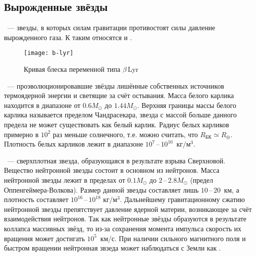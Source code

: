 \subsection{Вырожденные звёзды}
~--- звезды, в которых силам гравитации противостоят силы давление вырожденного газа. К таким относятся  и . 

\begin{figure}[!h]
	\centering
	\begin{minipage}[c]{0.49\tw}
 	\end{minipage}
 	\hfill
 	\begin{minipage}[c]{0.49\tw}
 		\centering
 		\texttt{[image: b-lyr]}	
 	\end{minipage}
 	\caption{Кривая блеска переменной типа $\beta$\,Lyr}
 	\label{pic:b-lyr}
 	\vspace{-.8pc}
\end{figure}
~--- проэволюционировавшие звёзды лишённые собственных источников термоядерной энергии и светящие за счёт остывания. Масса белого карлика находится в диапазоне от $0.6M_{\odot}$ до $1.44 M_{\odot}$. Верхняя границы массы белого карлика называется пределом Чандрасекара, звезда с массой больше данного предела не может существовать как белый карлик. Радиус белых карликов примерно в $10^2$ раз меньше солнечного, т.е. можно считать, что $R_\text{БК} \simeq R_\oplus$. Плотность белых карликов лежит в диапазоне $10^7$\,--\,$10^{10}$~$\text{кг}/\text{м}^3$.

~--- сверхплотная звезда, образующаяся в результате взрыва Сверхновой. Вещество нейтронной звезды состоит в основном из нейтронов. Масса нейтронной звезды лежит в пределах от $0.1M_{\odot}$ до $2$\,--\,$2.8M_{\odot}$ (предел Оппенгеймера-Волкова). Размер данной звезды составляет лишь $10$\,--\,$20$~км, а плотность составляет $10^{16}$\,--\,$10^{18}$ $\text{кг}/\text{м}^3$.  Дальнейшему гравитационному сжатию нейтронной звезды препятствует давление ядерной материи, возникающее за счёт взаимодействия нейтронов. Так как нейтронные звёзды образуются в результате  коллапса массивных звёзд, то из-за сохранения момента импульса скорость их вращения может достигать $10^5$~км/с. При наличии сильного магнитного поля и быстром вращении нейтронная звзеда может наблюдаться с Земли как .
